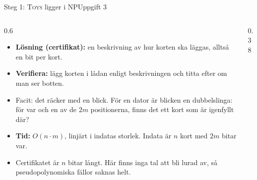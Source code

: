\documentclass[aspectratio=169,10pt]{beamer}
\newcommand{\hkort}[7][]{%
  \begin{scope}[shift={(#2,#3)},#1]
    \foreach \b [count=\j] in {#4} {\xdef\kortm{\j}}%
    \pgfmathsetmacro{\kH}{0.62+\kortm*0.36+0.34}%
    \path[#7] (0,0) -- (0.52,0) -- (0.52,0.13) -- (0.78,0.13) -- (0.78,0) -- (1.3,0)
      -- (1.3,\kH-0.50) -- (1.17,\kH-0.50) -- (1.17,\kH-0.32) -- (1.3,\kH-0.32) -- (1.3,\kH)
      -- (0,\kH) -- (0,\kH-0.32) -- (0.13,\kH-0.32) -- (0.13,\kH-0.50) -- (0,\kH-0.50) -- cycle;
    \node[font=\scriptsize,inner sep=0pt] at (0.65,\kH-0.25) {#6};
    \foreach \b [count=\j] in {#4} {
      \ifnum\b=1 \path[fill=#7m] (0.38,\kH-0.44-\j*0.36) circle (0.105);
      \else \path[korthal] (0.38,\kH-0.44-\j*0.36) circle (0.105); \fi}
    \foreach \b [count=\j] in {#5} {
      \ifnum\b=1 \path[fill=#7m] (0.92,\kH-0.44-\j*0.36) circle (0.105);
      \else \path[korthal] (0.92,\kH-0.44-\j*0.36) circle (0.105); \fi}
  \end{scope}}
\newcommand{\prob}[1]{\textsc{#1}}
\begin{document}
\begin{frame}{Steg 1: \prob{Toys} ligger i NP}{Uppgift 3}
  \begin{columns}[T]
    \begin{column}{0.6\textwidth}
      \begin{itemize}
        \item<1-> \textbf{Lösning (certifikat):} en beskrivning av hur korten ska läggas, alltså en bit per kort.
        \item<2-> \textbf{Verifiera:} lägg korten i lådan enligt beskrivningen och titta efter om man ser botten.
        \item<3-> Facit: det räcker med en blick. För en dator är blicken en dubbelslinga: för var och en av de $2m$ positionerna, finns det ett kort som är igenfyllt där?
        \item<4-> \textbf{Tid:} $O(n\cdot m)$, linjärt i indatas storlek. Indata är $n$ kort med $2m$ bitar var.
        \item<5-> Certifikatet är $n$ bitar långt. Här finns inga tal att bli lurad av, så pseudopolynomiska fällor saknas helt.
      \end{itemize}
    \end{column}
    \begin{column}{0.38\textwidth}
      \centering
    \end{column}
  \end{columns}
\end{frame}
\end{document}
